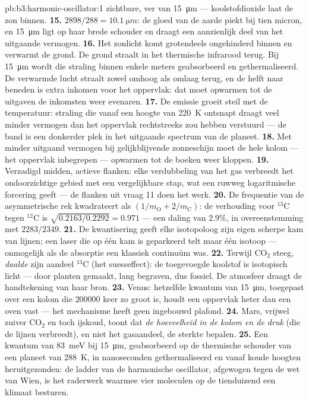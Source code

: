 \begin{solution}{pb:b3:harmonic-oscillator:1}
zichtbare, ver van \qty{15}{\micro m} --- koolstofdioxide laat de zon
binnen.
\textbf{15.} $2898/288 = \qty{10.1}{\micro m}$: de gloed van de aarde
piekt bij tien micron, en \qty{15}{\micro m} ligt op haar brede schouder
en draagt een aanzienlijk deel van het uitgaande vermogen.
\textbf{16.} Het zonlicht komt grotendeels ongehinderd binnen en verwarmt
de grond. De grond straalt in het thermische infrarood terug. Bij
\qty{15}{\micro m} wordt die straling binnen enkele meters geabsorbeerd en
gethermaliseerd. De verwarmde lucht straalt zowel omhoog als omlaag
terug, en de helft naar beneden is extra inkomen voor het oppervlak: dat
moet opwarmen tot de uitgaven de inkomsten weer evenaren.
\textbf{17.} De emissie groeit steil met de temperatuur: straling die
vanaf een hoogte van \qty{220}{K} ontsnapt draagt veel minder vermogen dan
het oppervlak rechtstreeks zou hebben verstuurd --- de band is een
donkerder plek in het uitgaande spectrum van de planeet.
\textbf{18.} Met minder uitgaand vermogen bij gelijkblijvende
zonneschijn moet de hele kolom --- het oppervlak inbegrepen --- opwarmen
tot de boeken weer kloppen.
\textbf{19.} Verzadigd midden, actieve flanken: elke verdubbeling van het
gas verbreedt het ondoorzichtige gebied met een vergelijkbare stap, wat
een ruwweg logaritmische forcering geeft --- de flanken uit vraag 11 doen
het werk.
\textbf{20.} De frequentie van de asymmetrische rek kwadrateert als
$(1/m_{
\text{O}} + 2/m_{\text{C}})$: de verhouding voor $^{13}$C tegen
$^{12}$C is $\sqrt{0.2163/0.2292} = 0.971$ --- een daling van $2.9\%$, in
overeenstemming met $2283/2349$.
\textbf{21.} De kwantisering geeft elke isotopoloog zijn eigen scherpe kam
van lijnen; een laser die op één kam is geparkeerd telt maar één isotoop
--- onmogelijk als de absorptie een klassiek continuüm was.
\textbf{22.} Terwijl CO$_2$ steeg, \emph{daalde} zijn aandeel $^{13}$C
(het suesseffect): de toegevoegde koolstof is isotopisch licht --- door
planten gemaakt, lang begraven, dus fossiel. De atmosfeer draagt de
handtekening van haar bron.
\textbf{23.} Venus: hetzelfde kwantum van \qty{15}{\micro m}, toegepast
over een kolom die $200000$ keer zo groot is, houdt een oppervlak heter
dan een oven vast --- het mechanisme heeft geen ingebouwd plafond.
\textbf{24.} Mars, vrijwel zuiver CO$_2$ en toch ijskoud, toont dat
\emph{de hoeveelheid in de kolom en de druk} (die de lijnen verbreedt), en
niet het gasaandeel, de sterkte bepalen.
\textbf{25.} Een kwantum van \qty{83}{meV} bij \qty{15}{\micro m},
geabsorbeerd op de thermische schouder van een planeet van \qty{288}{K},
in nanoseconden gethermaliseerd en vanaf koude hoogten heruitgezonden: de
ladder van de harmonische oscillator, afgewogen tegen de wet van Wien, is
het raderwerk waarmee vier moleculen op de tienduizend een klimaat
besturen.
\end{solution}
